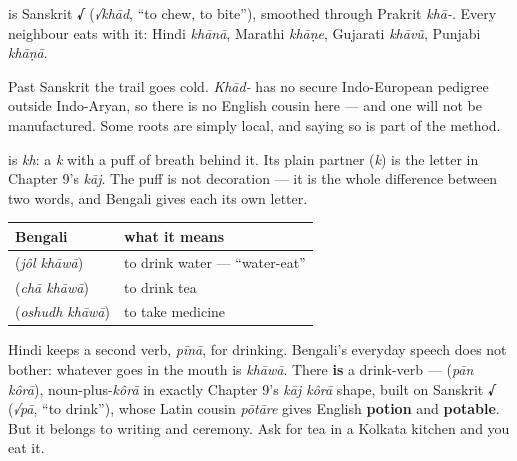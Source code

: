 \begin{cousinweb}
\textbf{} is Sanskrit \textbf{√} (\emph{√khād}, \textquotedblleft{}to chew, to bite\textquotedblright{}), smoothed through Prakrit \emph{khā-}. Every neighbour eats with it: Hindi \emph{khānā}, Marathi \emph{khāṇe}, Gujarati \emph{khāvũ}, Punjabi \emph{khāṇā}.

Past Sanskrit the trail goes cold. \emph{Khād-} has no secure Indo-European pedigree outside Indo-Aryan, so there is no English cousin here — and one will not be manufactured. Some roots are simply local, and saying so is part of the method.
\end{cousinweb}

\begin{sounds}
\textbf{} is \emph{kh}: a \emph{k} with a puff of breath behind it. Its plain partner \textbf{} (\emph{k}) is the letter in Chapter 9's \emph{kāj}. The puff is not decoration — it is the whole difference between two words, and Bengali gives each its own letter.
\end{sounds}

\begin{grammarlens}[title={Grammar Lens: Bengali eats its drinks}]
\noindent
\begin{tabularx}{\linewidth}{@{}>{\raggedright\arraybackslash}X>{\raggedright\arraybackslash}X@{}}
\toprule
\textbf{Bengali} & \textbf{what it means} \\
\midrule
\bn{জল} \bn{খাওয়া} (\emph{jôl khāwā}) & to drink water — \textquotedblleft{}water-eat\textquotedblright{} \\
\bn{চা} \bn{খাওয়া} (\emph{chā khāwā}) & to drink tea \\
\bn{ওষুধ} \bn{খাওয়া} (\emph{oshudh khāwā}) & to take medicine \\
\bottomrule
\end{tabularx}

Hindi keeps a second verb, \emph{pīnā}, for drinking. Bengali's everyday speech does not bother: whatever goes in the mouth is \emph{khāwā}. There \textbf{is} a drink-verb —   (\emph{pān kôrā}), noun-plus-\emph{kôrā} in exactly Chapter 9's \emph{kāj kôrā} shape, built on Sanskrit \textbf{√} (\emph{√pā}, \textquotedblleft{}to drink\textquotedblright{}), whose Latin cousin \emph{pōtāre} gives English \textbf{potion} and \textbf{potable}. But it belongs to writing and ceremony. Ask for tea in a Kolkata kitchen and you eat it.
\end{grammarlens}

